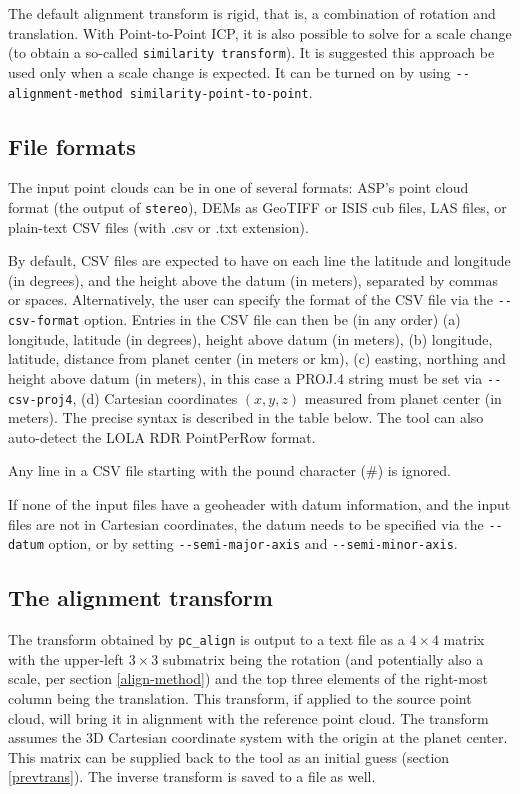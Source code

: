 The default alignment transform is rigid, that is, a combination of
rotation and translation. With Point-to-Point ICP, it is also possible
to solve for a scale change (to obtain a so-called \texttt{similarity
transform}). It is suggested this approach be used only when a scale
change is expected. It can be turned on by using
\texttt{-\/-alignment-method similarity-point-to-point}.

\subsection{File formats}

The input point clouds can be in one of several formats: ASP's point
cloud format (the output of \texttt{stereo}), DEMs as GeoTIFF or ISIS
cub files, LAS files, or plain-text CSV files (with .csv or .txt
extension).

By default, CSV files are expected to have on each line the latitude and
longitude (in degrees), and the height above the datum (in meters),
separated by commas or spaces. Alternatively, the user can specify the
format of the CSV file via the \texttt{-\/-csv-format} option. Entries
in the CSV file can then be (in any order) (a) longitude, latitude (in
degrees), height above datum (in meters), (b) longitude, latitude,
distance from planet center (in meters or km), (c) easting, northing and
height above datum (in meters), in this case a PROJ.4 string must be set
via \texttt{-\/-csv-proj4}, (d) Cartesian coordinates $(x, y, z)$
measured from planet center (in meters). The precise syntax is described
in the table below. The tool can also auto-detect the LOLA RDR
PointPerRow format.

Any line in a CSV file starting with the pound character (\#) is ignored.

If none of the input files have a geoheader with datum information, and
the input files are not in Cartesian coordinates, the datum needs to be
specified via the \texttt{-\/-datum} option, or by setting
\texttt{-\/-semi-major-axis} and \texttt{-\/-semi-minor-axis}.

\subsection{The alignment transform}

The transform obtained by \texttt{pc\_align} is output to a text file as
a $4\times 4$ matrix with the upper-left $3\times 3$ submatrix being the
rotation (and potentially also a scale, per section \ref{align-method}) and
the top three elements of the right-most column being the
translation. This transform, if applied to the source point cloud, will
bring it in alignment with the reference point cloud. The transform
assumes the 3D Cartesian coordinate system with the origin at the planet
center. This matrix can be supplied back to the tool as an initial guess
(section \ref{prevtrans}). The inverse transform is saved to a file as
well.

